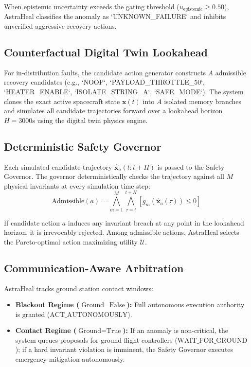 \documentclass[10pt,twocolumn]{article}
\begin{document}
When epistemic uncertainty exceeds the gating threshold ($u_{\text{epistemic}} \ge 0.50$), AstraHeal classifies the anomaly as `UNKNOWN\_FAILURE` and inhibits unverified aggressive recovery actions.

\subsection{Counterfactual Digital Twin Lookahead}
For in-distribution faults, the candidate action generator constructs $A$ admissible recovery candidates (e.g., `NOOP`, `PAYLOAD_THROTTLE_50`, `HEATER_ENABLE`, `ISOLATE_STRING_A`, `SAFE_MODE`). The system clones the exact active spacecraft state $\mathbf{x}(t)$ into $A$ isolated memory branches and simulates all candidate trajectories forward over a lookahead horizon $H = 3000\text{s}$ using the digital twin physics engine.

\subsection{Deterministic Safety Governor}
Each simulated candidate trajectory $\widehat{\mathbf{x}}_a(t:t+H)$ is passed to the Safety Governor. The governor deterministically checks the trajectory against all $M$ physical invariants at every simulation time step:
\begin{equation}
\text{Admissible}(a) = \bigwedge_{m=1}^M \bigwedge_{\tau=t}^{t+H} \left[ g_m(\widehat{\mathbf{x}}_a(\tau)) \le 0 \right]
\end{equation}

If candidate action $a$ induces any invariant breach at any point in the lookahead horizon, it is irrevocably rejected. Among admissible actions, AstraHeal selects the Pareto-optimal action maximizing utility $\mathcal{U}$.

\subsection{Communication-Aware Arbitration}
AstraHeal tracks ground station contact windows:
\begin{itemize}
    \item \textbf{Blackout Regime ($\text{Ground} = \text{False}$):} Full autonomous execution authority is granted ($\text{ACT\_AUTONOMOUSLY}$).
    \item \textbf{Contact Regime ($\text{Ground} = \text{True}$):} If an anomaly is non-critical, the system queues proposals for ground flight controllers ($\text{WAIT\_FOR\_GROUND}$); if a hard invariant violation is imminent, the Safety Governor executes emergency mitigation autonomously.
\end{itemize}
\end{document}
